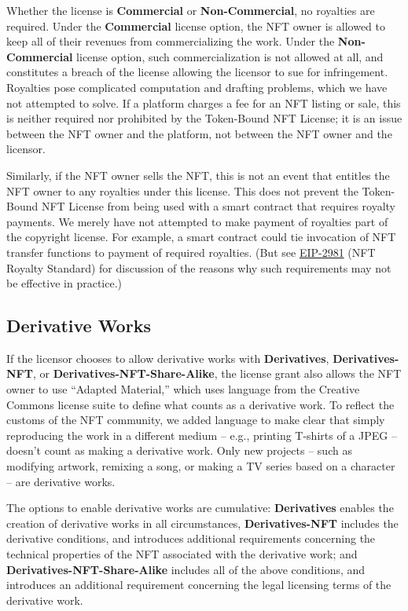 \documentclass{article}
\newcommand{\iccclicense}{Token-Bound NFT License\xspace}
\newcommand{\keyword}[1]{\textbf{#1}\xspace}
\newcommand{\commercial}{\keyword{Commercial}}
\newcommand{\noncommercial}{\keyword{Non-Commercial}}
\newcommand{\derivative}{\keyword{Derivatives}}
\newcommand{\derivativetracking}{\keyword{Derivatives-NFT}}
\newcommand{\sharealike}{\keyword{Derivatives-NFT-Share-Alike}}
\begin{document}
Whether the license is \commercial or \noncommercial, no royalties are required. Under the \commercial license option, the NFT owner is allowed to keep all of their revenues from commercializing the work. Under the \noncommercial license option, such commercialization is not allowed at all, and constitutes a breach of the license allowing the licensor to sue for infringement. Royalties pose complicated computation and drafting problems, which we have not attempted to solve. If a platform charges a fee for an NFT listing or sale, this is neither required nor prohibited by the \iccclicense; it is an issue between the NFT owner and the platform, not between the NFT owner and the licensor.  

Similarly, if the NFT owner sells the NFT, this is not an event that entitles the NFT owner to any royalties under this license.  This does not prevent the \iccclicense from being used with a smart contract that requires royalty payments. We merely have not attempted to make payment of royalties part of the copyright license. For example, a smart contract could tie invocation of NFT transfer functions to payment of required royalties. (But see \href{https://eips.ethereum.org/EIPS/eip-2981}{EIP-2981} (NFT Royalty Standard) for discussion of the reasons why such requirements may not  be effective in practice.) 

\subsection{Derivative Works}

If the licensor chooses to allow derivative works with \derivative, \derivativetracking, or \sharealike, the license grant also allows the NFT owner to use ``Adapted Material,'' which uses language from the Creative Commons license suite to define what counts as a derivative work. To reflect the customs of the NFT community, we added language to make clear that simply reproducing the work in a different medium -- e.g., printing T-shirts of a JPEG -- doesn't count as making a derivative work. Only new projects -- such as modifying artwork, remixing a song, or making a TV series based on a character -- are derivative works.

The options to enable derivative works are cumulative: \derivative enables the creation of derivative works in all circumstances, \derivativetracking includes the derivative conditions, and introduces additional requirements concerning the technical properties of the NFT associated with the derivative work; and \sharealike includes all of the above conditions, and introduces an additional requirement concerning the legal licensing terms of the derivative work.
\end{document}
